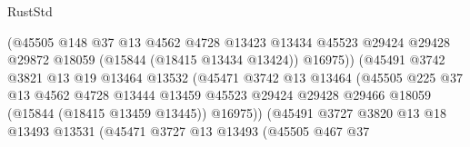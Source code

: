 \begin{lexlean}{RustStd}
\begin{coremodule}
                                      (@45505
                                        @148
                                        @37
                                        @13
                                        @4562
                                        @4728
                                        @13423
                                        @13434
                                        @45523
                                        @29424
                                        @29428
                                        @29872
                                        @18059
                                        (@15844 (@18415 @13434 @13424))
                                        @16975))
                                    (@45491
                                      @3742
                                      @3821
                                      @13
                                      @19
                                      @13464
                                      @13532
                                      (@45471
                                        @3742
                                        @13
                                        @13464
                                        (@45505
                                          @225
                                          @37
                                          @13
                                          @4562
                                          @4728
                                          @13444
                                          @13459
                                          @45523
                                          @29424
                                          @29428
                                          @29466
                                          @18059
                                          (@15844 (@18415 @13459 @13445))
                                          @16975))
                                      (@45491
                                        @3727
                                        @3820
                                        @13
                                        @18
                                        @13493
                                        @13531
                                        (@45471
                                          @3727
                                          @13
                                          @13493
                                          (@45505
                                            @467
                                            @37

\end{coremodule}
\end{lexlean}
